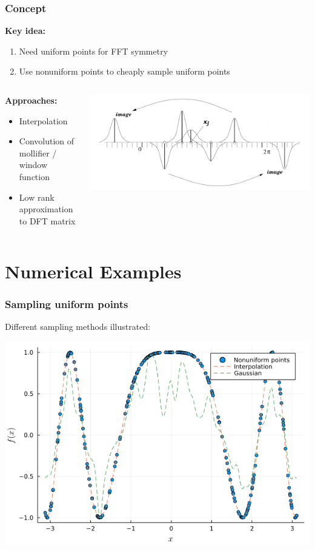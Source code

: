 \documentclass{beamer}
\begin{document}
\begin{frame}
  \frametitle{Concept}
  \textbf{Key idea:}
  \begin{enumerate}
      \item Need uniform points for FFT symmetry
      \item Use nonuniform points to cheaply sample uniform points
  \end{enumerate}

  \vfill

  \begin{columns}
      \begin{column}{.5\textwidth}
        \textbf{Approaches:}
        \begin{itemize}
            \item Interpolation
            \item Convolution of mollifier / window function
            \item Low rank approximation to DFT matrix
        \end{itemize}
      \end{column}
      \begin{column}{.5\textwidth}
        \centering \includegraphics[width=\textwidth]{images/sample_gaussian.png}
      \end{column}
  \end{columns}
\end{frame}

\section{Numerical Examples}

\begin{frame}
  \frametitle{Sampling uniform points}
  Different sampling methods illustrated:

  \vfill

  \centering \includegraphics[width=.8\textwidth]{images/conv_vs_interp.png}
\end{frame}
\end{document}
